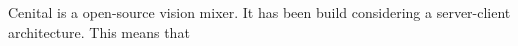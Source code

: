 \documentclass[../main.tex]{subfiles}
\begin{document}
Cenital is a open-source vision mixer. It has been build considering a server-client architecture. This means that
\end{document}
